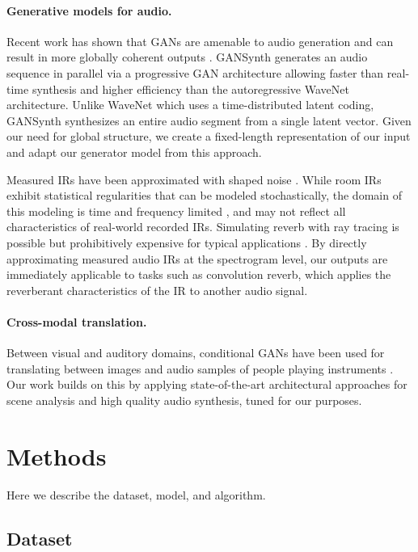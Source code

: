 \documentclass[10pt,twocolumn,letterpaper]{article}
\begin{document}
\paragraph{Generative models for audio.}
Recent work has shown that GANs are amenable to audio generation and can result in more globally coherent outputs \cite{donahue2018adversarial}. GANSynth \cite{engel2018gansynth} generates an audio sequence in parallel via a progressive GAN architecture allowing faster than real-time synthesis and higher efficiency than the autoregressive WaveNet \cite{Oord2016} architecture. Unlike WaveNet which uses a time-distributed latent coding, GANSynth synthesizes an entire audio segment from a single latent vector. Given our need for global structure, we create a fixed-length representation of our input and adapt our generator model from this approach.

Measured IRs have been approximated with shaped noise \cite{lee2010approximating, bryan2020impulse}. While room IRs exhibit statistical regularities \cite{traer2016statistics} that can be modeled stochastically, the domain of this modeling is time and frequency limited \cite{badeau2019common}, and may not reflect all characteristics of real-world recorded IRs. Simulating reverb with ray tracing is possible but prohibitively expensive for typical applications \cite{Schissler2016}. By directly approximating measured audio IRs at the spectrogram level, our outputs are immediately applicable to tasks such as convolution reverb, which applies the reverberant characteristics of the IR to another audio signal.

\paragraph{Cross-modal translation.}
Between visual and auditory domains, conditional GANs have been used for translating between images and audio samples of people playing instruments \cite{Chen2017}. Our work builds on this by applying state-of-the-art architectural approaches for scene analysis and high quality audio synthesis, tuned for our purposes.

\section{Methods}
\label{methods}
\noindent Here we describe the dataset, model, and algorithm.

\subsection{Dataset}
\end{document}
